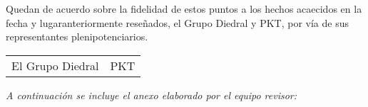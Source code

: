 \documentclass[twoside, a4paper, 11pt]{article}
\begin{document}
	\vspace*{1cm}

	Quedan de acuerdo sobre la fidelidad de estos puntos a los hechos acaecidos en la fecha y lugar\break anteriormente reseñados, el Grupo Diedral y PKT, por vía de sus representantes plenipotenciarios.\\

	\begin{tabularx}{.9\linewidth}{X  >{\raggedleft}X}
		El Grupo Diedral & PKT
	\end{tabularx}

	\vfill{}
	{\itshape A continuación se incluye el anexo elaborado por el equipo revisor:}

	
\end{document}
